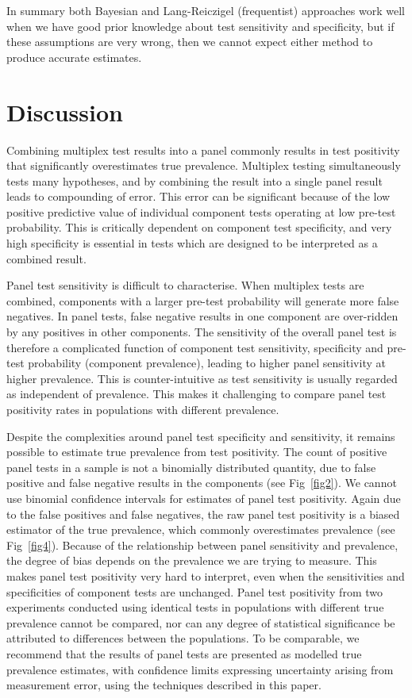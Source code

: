 \documentclass[10pt,letterpaper]{article}
\begin{document}
In summary both Bayesian and Lang-Reiczigel (frequentist) approaches work well when we have good prior knowledge about test sensitivity and specificity, but if these assumptions are very wrong, then we cannot expect either method to produce accurate estimates.

\section*{Discussion}

Combining multiplex test results into a panel commonly results in test positivity that significantly overestimates true prevalence. Multiplex testing simultaneously tests many hypotheses, and by combining the result into a single panel result leads to compounding of error. This error can be significant because of the low positive predictive value of individual component tests operating at low pre-test probability. This is critically dependent on component test specificity, and very high specificity is essential in tests which are designed to be interpreted as a combined result.

Panel test sensitivity is difficult to characterise. When multiplex tests are combined, components with a larger pre-test probability will generate more false negatives. In panel tests, false negative results in one component are over-ridden by any positives in other components. The sensitivity of the overall panel test is therefore a complicated function of component test sensitivity, specificity and pre-test probability (component prevalence), leading to higher panel sensitivity at higher prevalence. This is counter-intuitive as test sensitivity is usually regarded as independent of prevalence. This makes it challenging to compare panel test positivity rates in populations with different prevalence.

Despite the complexities around panel test specificity and sensitivity, it remains possible to estimate true prevalence from test positivity. The count of positive panel tests in a sample is not a binomially distributed quantity, due to false positive and false negative results in the components (see Fig~\ref{fig2}). We cannot use binomial confidence intervals for estimates of panel test positivity. Again due to the false positives and false negatives, the raw panel test positivity is a biased estimator of the true prevalence, which commonly overestimates prevalence (see Fig~\ref{fig4}). Because of the relationship between panel sensitivity and prevalence, the degree of bias depends on the prevalence we are trying to measure. This makes panel test positivity very hard to interpret, even when the sensitivities and specificities of component tests are unchanged. Panel test positivity from two experiments conducted using identical tests in populations with different true prevalence cannot be compared, nor can any degree of statistical significance be attributed to differences between the populations. To be comparable, we recommend that the results of panel tests are presented as modelled true prevalence estimates, with confidence limits expressing uncertainty arising from measurement error, using the techniques described in this paper.
\end{document}

